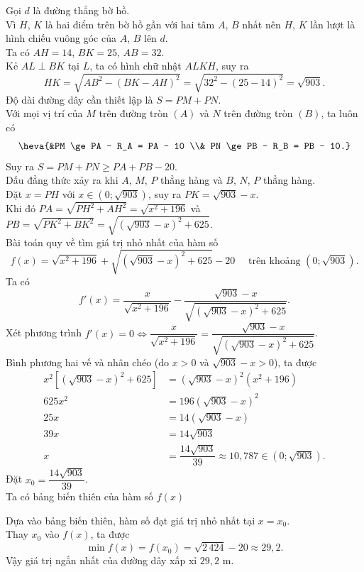 \begin{ex}
{		Gọi $d$ là đường thẳng bờ hồ.\\ Vì $H$, $K$ là hai điểm trên bờ hồ gần với hai tâm $A$, $B$ nhất nên $H$, $K$ lần lượt là hình chiếu vuông góc của $A$, $B$ lên $d$. \\
		Ta có $AH = 14$, $BK = 25$, $AB = 32$.\\ Kẻ $AL \perp BK$ tại $L$, ta có hình chữ nhật $ALKH$, suy ra
		\[HK = \sqrt{AB^2 - (BK - AH)^2} = \sqrt{32^2 - (25-14)^2} = \sqrt{903}. \]
		Độ dài đường dây cần thiết lập là $S = PM + PN$. \\
		Với mọi vị trí của $M$ trên đường tròn $(A)$ và $N$ trên đường tròn $(B)$, ta luôn có
		\[\heva{&PM \ge PA - R_A = PA - 10 \\& PN \ge PB - R_B = PB - 10.} \]
		Suy ra $S = PM + PN \ge PA + PB - 20$.\\ Dấu đẳng thức xảy ra khi $A$, $M$, $P$ thẳng hàng và $B$, $N$, $P$ thẳng hàng.\\
		Đặt $x = PH$ với $x \in \left(0; \sqrt{903}\right)$, suy ra $PK = \sqrt{903} - x$. \\
		Khi đó $PA = \sqrt{PH^2 + AH^2} = \sqrt{x^2 + 196}$ và $PB = \sqrt{PK^2 + BK^2} = \sqrt{\left(\sqrt{903}-x\right)^2 + 625}$. \\
		Bài toán quy về tìm giá trị nhỏ nhất của hàm số
		\[f(x) = \sqrt{x^2 + 196} + \sqrt{\left(\sqrt{903}-x\right)^2 + 625} - 20 \quad \text{ trên khoảng } \left(0; \sqrt{903}\right). \]
		Ta có
		\[f'(x) = \dfrac{x}{\sqrt{x^2 + 196}} - \dfrac{\sqrt{903}-x}{\sqrt{\left(\sqrt{903}-x\right)^2 + 625}}. \]
		Xét phương trình $f'(x) = 0 \Leftrightarrow \dfrac{x}{\sqrt{x^2 + 196}} = \dfrac{\sqrt{903}-x}{\sqrt{\left(\sqrt{903}-x\right)^2 + 625}}$.\\
		Bình phương hai vế và nhân chéo (do $x > 0$ và $\sqrt{903}-x > 0$), ta được
		\begin{align*}
			x^2\left[\left(\sqrt{903}-x\right)^2 + 625 \right] &= \left(\sqrt{903}-x\right)^2 (x^2 + 196) \\
			625 x^2 &= 196\left(\sqrt{903}-x\right)^2 \\
			25 x &= 14(\sqrt{903}-x) \\
			39 x &= 14\sqrt{903} \\
			x &= \dfrac{14\sqrt{903}}{39} \approx 10{,}787 \in \left(0; \sqrt{903}\right).
		\end{align*}
		Đặt $x_0 = \dfrac{14\sqrt{903}}{39}$.\\ Ta có bảng biến thiên của hàm số $f(x)$
		\begin{center}
		\end{center}
		Dựa vào bảng biến thiên, hàm số đạt giá trị nhỏ nhất tại $x = x_0$. \\
		Thay $x_0$ vào $f(x)$, ta được
		\[\min f(x) = f(x_0) = \sqrt{2\,424} - 20 \approx 29{,}2. \]
		Vậy giá trị ngắn nhất của đường dây xấp xỉ $29{,}2$ m.
	}
\end{ex}

